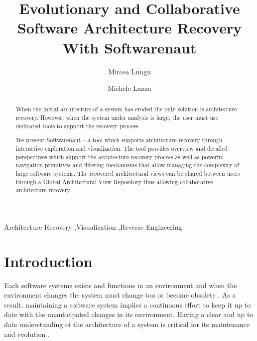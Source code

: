 \documentclass[preprint,12pt]{elsarticle}
\begin{document}
\begin{frontmatter}


\title{Evolutionary and Collaborative Software Architecture Recovery With Softwarenaut}

\author{Mircea Lungu}
\address{Software Composition Group - University of Bern, Switzerland}

\author{Michele Lanza}
\address{REVEAL @ Faculty of Informatics - University of Lugano, Switzerland}


\begin{abstract}

When the initial architecture of a system has eroded the only solution is architecture recovery. However, when the system under analysis is large, the user must use dedicated tools to support the recovery process. 

We present Softwarenaut -- a tool which supports architecture recovery through interactive exploration and visualization. The tool provides overview and detailed perspectives which support the architecture recovery process as well as powerful navigation primitives and filtering mechanisms that allow managing the complexity of large software systems. The recovered architectural views can be shared between users through a Global Architectural View Repository thus allowing collaborative architecture recovery.

\end{abstract}

\begin{keyword}
Architecture Recovery \sep Visualization \sep Reverse Engineering
\end{keyword}

\end{frontmatter}

\section{Introduction} \label{sec:Introduction}

Each software systems exists and functions in an environment and when the environment changes the system must change too or become obsolete \cite{lehman-softev}. As a result, maintaining a software system implies a continuous effort to keep it up to date with the unanticipated changes in its environment. Having a clear and up to date understanding of the architecture of a system is critical for its maintenance and evolution \cite{Duca09c, pollet-sar}.
\end{document}
